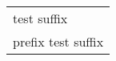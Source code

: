 \documentclass{article}
\begin{document}
\def\test{
  \directlua{
    local lparse = require('lparse')
    local oarg, marg = lparse.scan('O{} v')
    print(oarg, marg)
  }
}
\begin{tabular}{l}
\test{test} suffix \\
prefix \test{test} suffix \\
\end{tabular}
\end{document}

